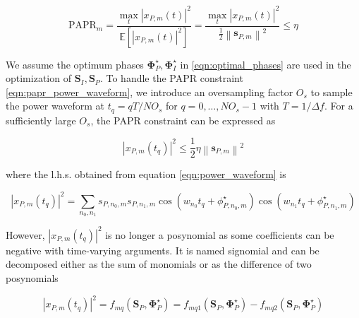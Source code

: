 \begin{equation}\label{eqn:papr_power_waveform}
  {\text{PAPR}_m} = \frac{{\mathop {\max }\limits_t {{\left| {{x_{P,m}}(t)} \right|}^2}}}{{\mathbb{E}\left[ {{{\left| {{x_{P,m}}(t)} \right|}^2}} \right]}} = \frac{{\mathop {\max }\limits_t {{\left| {{x_{P,m}}(t)} \right|}^2}}}{{\frac{1}{2}{{\left\| {{{\mathbf{s}}_{P,m}}} \right\|}^2}}} \leqslant \eta
\end{equation}

We assume the optimum phases ${\mathbf{\Phi }}_P^ \star ,{\mathbf{\Phi }}_I^ \star $ in \eqref{eqn:optimal_phases} are used in the optimization of ${{\mathbf{S}}_I},{{\mathbf{S}}_P}$. To handle the PAPR constraint \eqref{eqn:papr_power_waveform}, we introduce an oversampling factor ${O_s}$ to sample the power waveform at ${t_q} = qT/N{O_s}$ for $q = 0, \ldots ,N{O_s} - 1$ with $T = 1/\Delta f$. For a sufficiently large ${O_s}$, the PAPR constraint can be expressed as

\begin{equation}\label{eqn:papr_sample}
  {\left| {{x_{P,m}}\left( {{t_q}} \right)} \right|^2} \leqslant \frac{1}{2}\eta {\left\| {{{\mathbf{s}}_{P,m}}} \right\|^2}
\end{equation}

where the l.h.s. obtained from equation \eqref{eqn:power_waveform} is

\begin{equation}\label{eqn:papr_average_sample}
  {\left| {{x_{P,m}}\left( {{t_q}} \right)} \right|^2} = \sum\limits_{{n_0},{n_1}} {{s_{P,{n_0},m}}{s_{P,{n_1},m}}\cos \left( {{w_{{n_0}}}{t_q} + \phi _{P,{n_0},m}^ \star } \right)\cos \left( {{w_{{n_1}}}{t_q} + \phi _{P,{n_1},m}^ \star } \right)}
\end{equation}

However, ${\left| {{x_{P,m}}\left( {{t_q}} \right)} \right|^2}$ is no longer a posynomial as some coefficients can be negative with time-varying arguments. It is named signomial \cite{Boyd2007} and can be decomposed either as the sum of monomials or as the difference of two posynomials

\begin{equation}\label{eqn:papr_signomial}
  {\left| {{x_{P,m}}\left( {{t_q}} \right)} \right|^2} = {f_{mq}}\left( {{{\mathbf{S}}_P},{\mathbf{\Phi }}_P^ \star } \right) = {f_{mq1}}\left( {{{\mathbf{S}}_P},{\mathbf{\Phi }}_P^ \star } \right) - {f_{mq2}}\left( {{{\mathbf{S}}_P},{\mathbf{\Phi }}_P^ \star } \right)
\end{equation}

